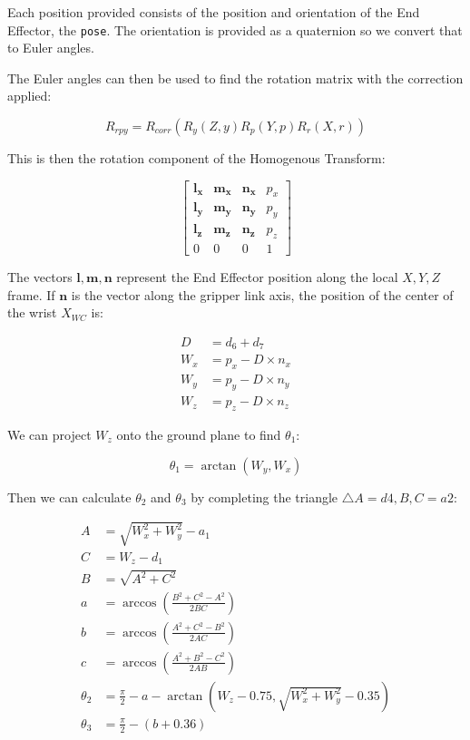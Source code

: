 \documentclass{article}
\begin{document}
Each position provided consists of the position and orientation of the
End Effector, the \texttt{pose}. The orientation is provided as
a quaternion so we convert that to Euler angles.

The Euler angles can then be used to find the rotation matrix with the
correction applied:

\begin{equation}
    R_{rpy} = R_{corr}(R_y(Z, y)R_p(Y, p)R_r(X, r))
\end{equation}

This is then the rotation component of the Homogenous Transform:

\begin{equation}
    \begin{bmatrix}
        \mathbf{l_x} & \mathbf{m_x} & \mathbf{n_x} & p_x \\
        \mathbf{l_y} & \mathbf{m_y} & \mathbf{n_y} & p_y \\
        \mathbf{l_z} & \mathbf{m_z} & \mathbf{n_z} & p_z \\
        0 & 0 & 0 & 1
    \end{bmatrix}
\end{equation}

The vectors $\mathbf{l}, \mathbf{m}, \mathbf{n}$
represent the End Effector position along the local $X, Y, Z$
frame. If $\mathbf{n}$ is the vector along the gripper link axis, the
position of the center of the wrist $X_{WC}$ is:

\begin{align}
  D &= d_6 + d_7 \\
  W_x &= p_x - D \times n_x \\
  W_y &= p_y - D \times n_y \\
  W_z &= p_z - D \times n_z
\end{align}

We can project $W_z$ onto the ground plane to find $\theta_1$:

\begin{equation}
    \theta_1 = \arctan(W_y, W_x)
\end{equation}

Then we can calculate $\theta_2$ and $\theta_3$ by completing the
triangle  $\bigtriangleup A = d4, B, C = a2$:

\begin{align}
  A &= \sqrt{W_x^2 + W_y^2} - a_1 \\
  C &= W_z - d_1 \\
  B &= \sqrt{A^2 + C^2} \\
  a &= \arccos(\frac{B^2 + C^2 - A^2}{2BC}) \\
  b &= \arccos(\frac{A^2 + C^2 - B^2}{2AC}) \\
  c &= \arccos(\frac{A^2 + B^2 - C^2}{2AB}) \\
  \theta_2 &= \frac{\pi}{2} - a - \arctan(W_z - 0.75, \sqrt{W_x^2 + W_y^2} - 0.35) \\
  \theta_3 &= \frac{\pi}{2} - (b + 0.36)
\end{align}
\end{document}
